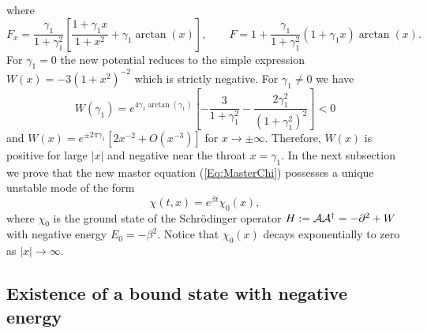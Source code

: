 \documentclass[           %
               showpacs,            %
               preprintnumbers,     %
               aps,                 %
               prd,                 %
               superscriptaddress,      %
               nofootinbib,         %
               tightenlines,        %
               floats,floatfix      %
               ]{revtex4}
\begin{document}
where
\begin{displaymath}
F_x = \frac{\gamma_1}{1+\gamma_1^2}\left[ \frac{1+\gamma_1 x}{1+x^2}
 + \gamma_1\arctan(x) \right], \qquad
F = 1 + \frac{\gamma_1}{1 + \gamma_1^2}(1 + \gamma_1 x)\arctan(x).
\end{displaymath}
For $\gamma_1=0$ the new potential reduces to the simple expression
$W(x) = -3(1 + x^2)^{-2}$ which is strictly negative. For
$\gamma_1\neq 0$ we have
\begin{displaymath}
W(\gamma_1) = e^{4\gamma_1\arctan(\gamma_1)}\left[
 -\frac{3}{1+\gamma_1^2} - \frac{2\gamma_1^2}{(1+\gamma_1^2)^2} \right]
 < 0
\end{displaymath}
and $W(x) = e^{\pm 2\pi\gamma_1} \left[ 2x^{-2} + O(x^{-3}) \right]$
for $x \to \pm\infty$. Therefore, $W(x)$ is positive for large $|x|$
and negative near the throat $x = \gamma_1$. In the next subsection we
prove that the new master equation (\ref{Eq:MasterChi}) possesses a
unique unstable mode of the form
\begin{displaymath}
\chi(t,x) = e^{\beta t}\chi_0(x),
\end{displaymath}
where $\chi_0$ is the ground state of the Schr\"odinger operator $H :=
{\cal A}{\cal A}^\dagger = -\partial^2 + W$ with negative energy $E_0
= -\beta^2$. Notice that $\chi_0(x)$ decays exponentially to zero as
$|x|\to\infty$.



\subsection{Existence of a bound state with negative energy}
\label{Sec:LinStabBoundState}
\end{document}
